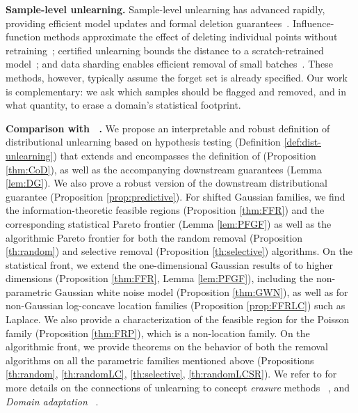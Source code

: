 \textbf{Sample-level unlearning.}
Sample-level unlearning has advanced rapidly, providing efficient model updates and formal deletion guarantees~\citep{neel2021descent,zhang2024towards,chien2024langevin,allouah2024utility,koloskova2025certified,pandey2026gaussian}. 
Influence-function methods approximate the effect of deleting individual points without retraining~\citep{izzo2021approximate}; certified unlearning bounds the distance to a scratch-retrained model~\citep{guo2020certified}; and data sharding enables efficient removal of small batches~\citep{bourtoule2021machine}. 
These methods, however, typically assume the forget set is already specified. Our work is complementary: we ask which samples should be flagged and removed, and in what quantity, to erase a domain’s statistical footprint.



\textbf{Comparison with ~\citet{allouah2025distributionalmachineunlearningselective}.}  
We propose an interpretable and robust definition of distributional unlearning based on hypothesis testing  (Definition \ref{def:dist-unlearning}) that extends and encompasses the definition of \citep{allouah2025distributionalmachineunlearningselective} (Proposition \ref{thm:CoD}), as well as the accompanying downstream guarantees (Lemma \ref{lem:DG}). We also prove a robust version of the downstream distributional guarantee (Proposition \ref{prop:predictive}). For shifted Gaussian families, we find the information-theoretic feasible regions (Proposition \ref{thm:FFR}) and the corresponding statistical Pareto frontier (Lemma \ref{lem:PFGF}) as well as the algorithmic Pareto frontier for both the random removal (Proposition \ref{th:random}) and selective removal (Proposition \ref{th:selective}) algorithms. On the statistical front, we extend the one-dimensional Gaussian results of \citep{allouah2025distributionalmachineunlearningselective} to higher dimensions (Proposition \ref{thm:FFR}, Lemma \ref{lem:PFGF}), including the non-parametric Gaussian white noise model (Proposition \ref{thm:GWN}), as well as for non-Gaussian log-concave location families (Proposition \ref{prop:FFRLC}) such as Laplace. We also provide a characterization of the feasible region for the Poisson family (Proposition \ref{thm:FRP}), which is a non-location family. On the algorithmic front, we provide theorems on the behavior of both the removal algorithms on all the parametric families mentioned above (Propositions \ref{th:random}, \ref{th:randomLC}, \ref{th:selective}, \ref{th:randomLCSR}). We refer to \citep{allouah2025distributionalmachineunlearningselective} for more details on the connections of unlearning to  concept \textit{ erasure} methods  
~\citep{ravfogel2020null, kaushik2020learning, elazar2018adversarial}, and \textit{Domain adaptation} ~\citep{ben2010theory}.

